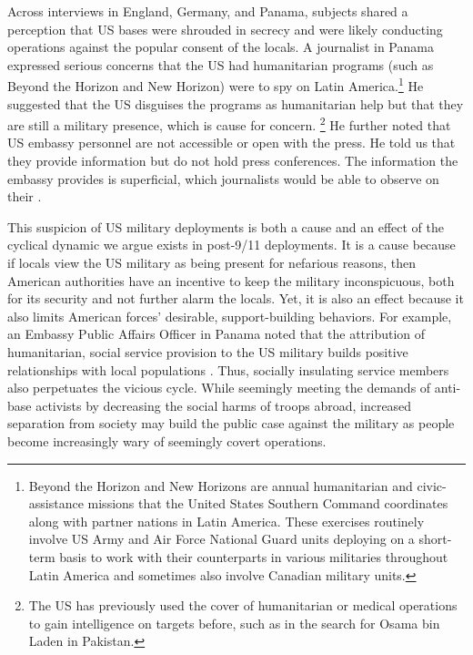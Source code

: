 Across interviews in England, Germany, and Panama, subjects shared a perception that US bases were shrouded in secrecy and were likely conducting operations against the popular consent of the locals. A journalist in Panama expressed serious concerns that the US had humanitarian programs (such as Beyond the Horizon and New Horizon) were to spy on Latin America.\footnote{Beyond the Horizon and New Horizons are annual humanitarian and civic-assistance missions that the United States Southern Command coordinates along with partner nations in Latin America. These exercises routinely involve US Army and Air Force National Guard units deploying on a short-term basis to work with their counterparts in various militaries throughout Latin America and sometimes also involve Canadian military units.}  He suggested that the US disguises the programs as humanitarian help but that they are still a military presence, which is cause for concern. \footnote{The US has previously used the cover of humanitarian or medical operations to gain intelligence on targets before, such as in the search for Osama bin Laden in Pakistan.} He further noted that US embassy personnel are not accessible or open with the press.  He told us that they provide information but do not hold press conferences. The information the embassy provides is superficial, which journalists would be able to observe on their \cite{journ20180713}.


This suspicion of US military deployments is both a cause and an effect of the cyclical dynamic we argue exists in post-9/11 deployments. It is a cause because if locals view the US military as being present for nefarious reasons, then American authorities have an incentive to keep the military inconspicuous, both for its security and not further alarm the locals. Yet, it is also an effect because it also limits American forces' desirable, support-building behaviors. For example, an Embassy Public Affairs Officer in Panama noted that the attribution of humanitarian, social service provision to the US military builds positive relationships with local populations \cite{embone20180712}. Thus, socially insulating service members also perpetuates the vicious cycle. While seemingly meeting the demands of anti-base activists by decreasing the social harms of troops abroad, increased separation from society may build the public case against the military as people become increasingly wary of seemingly covert operations.

